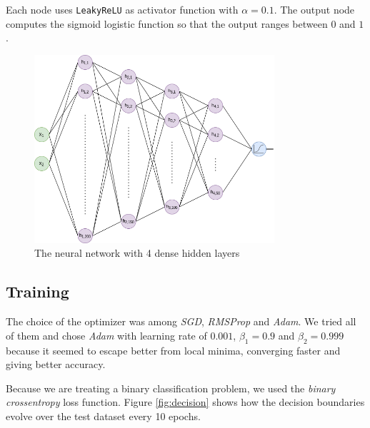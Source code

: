 \documentclass[compsoc]{IEEEtran}
\begin{document}
Each node uses \texttt{LeakyReLU} as activator function with $\alpha=0.1$. The output node computes the sigmoid logistic function so that the output ranges between $0$ and $1$.

\begin{figure}[ht!]
\centering                                                                        
\includegraphics[width=3.5in]{../images/nn-1.png}
\captionsetup{justification=centering}                                                                                                                                   
\caption{The neural network with 4 dense hidden layers}
\label{fig:nn}                                                                                                                                                           
\end{figure}

\subsection{Training}
The choice of the optimizer was among \emph{SGD}, \emph{RMSProp} and \emph{Adam}. We tried all of them and chose \emph{Adam} 
with learning rate of $0.001$, $\beta_{1}=0.9$ and $\beta_{2}=0.999$ because it seemed to escape better from local minima, converging faster and giving better accuracy. \par
Because we are treating a binary classification problem, we used the \emph{binary crossentropy} loss function.
Figure \ref{fig:decision} shows how the decision boundaries evolve over the test dataset every 10 epochs.
\end{document}
